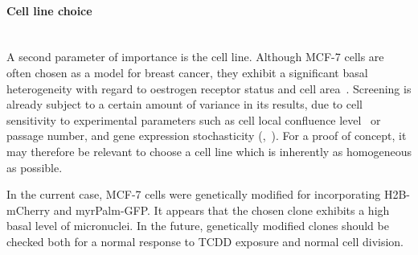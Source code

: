 \paragraph{Cell line choice}~\\
A second parameter of importance is the cell line. Although MCF-7 cells are often chosen as a model for breast cancer, they exhibit a significant basal heterogeneity with regard to oestrogen receptor status and cell area~\cite{pmid11153613}. Screening is already subject to a certain amount of variance in its results, due to cell sensitivity to experimental parameters such as cell local confluence level~\cite{pmid19710653} or passage number, and gene expression stochasticity (\cite{pmid12183631},~\cite{pmid18957198}). For a proof of concept, it may therefore be relevant to choose a cell line which is inherently as homogeneous as possible.

In the current case, MCF-7 cells were genetically modified for incorporating H2B-mCherry and myrPalm-GFP. It appears that the chosen clone exhibits a high basal level of micronuclei. In the future, genetically modified clones should be checked both for a normal response to TCDD exposure and normal cell division.


%

%
